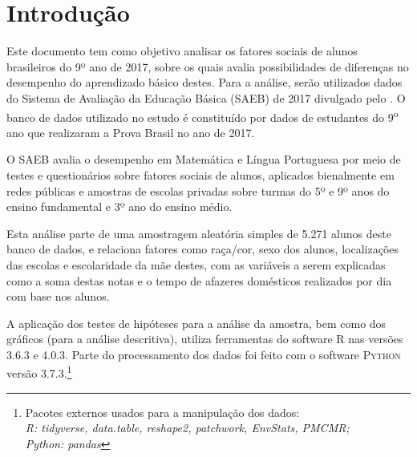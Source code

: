 
\chapter*[Introdução]{Introdução}

Este documento tem como objetivo analisar os fatores sociais de alunos brasileiros do 9º ano de 2017,
sobre os quais avalia possibilidades de diferenças no desempenho do aprendizado básico destes.
Para a análise, serão utilizados dados do Sistema de Avaliação da Educação Básica (SAEB) de 2017 
divulgado pelo . O banco de dados utilizado no estudo é constituído por dados de
estudantes do 9\textsuperscript{o} ano que realizaram a Prova Brasil no ano de 2017.

O SAEB avalia o desempenho em Matemática e Língua Portuguesa por meio de testes e questionários sobre fatores sociais de
alunos, aplicados bienalmente em redes públicas
e amostras de escolas privadas sobre turmas do 5º e 9º anos do ensino fundamental e 
3º ano do ensino médio.

Esta análise parte de uma amostragem aleatória simples de 5.271 alunos deste banco de dados, e relaciona 
fatores como raça/cor, sexo dos alunos, localizações das escolas e escolaridade da mãe destes, com as variáveis
a serem explicadas como a soma destas notas e o tempo de afazeres domésticos realizados por dia com base nos alunos.


A aplicação dos testes de hipóteses para a análise da amostra, bem como dos gráficos (para a análise descritiva), utiliza ferramentas
do software \textsc{R} nas versões 3.6.3 e 4.0.3. Parte do processamento dos dados foi feito com o software \textsc{Python} versão 3.7.3.\footnote{Pacotes externos usados para a manipulação dos dados:\\\textit{R: tidyverse, data.table, reshape2, patchwork, EnvStats, PMCMR; \\Python: pandas}}

